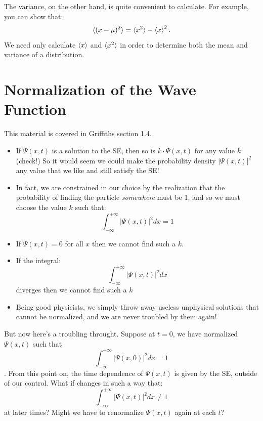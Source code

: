 \documentclass[12pt]{book}
\begin{document}
The variance, on the other hand, is quite convenient to calculate.
For example, you can show that:
\begin{equation}
\label{eqn:varhw}
\braket{(x-\mu)^2} = \braket{x^2} -\braket{x}^2.
\end{equation}
We need only calculate $\braket{x}$ and $\braket{x^2}$ in order
to determine both the mean and variance of a distribution.

\section{Normalization of the Wave Function}

This material is covered in Griffiths section 1.4.  
\begin{itemize}
 \item If $\Psi(x,t)$ is a solution to the SE, then so is $k \cdot \Psi(x,t)$ for any value $k$ (check!)  So it would seem we could make the probability density $|\Psi(x,t)|^2$ any value that we like and still satisfy the SE!  
 \item In fact, we are constrained in our choice by the realization that the probability of finding the particle {\em somewhere} must be 1, and so we must choose the value $k$ such that:
\begin{equation}
\label{eqn:norm}
\int_{-\infty}^{+\infty} |\Psi(x,t)|^2 dx = 1
\end{equation}

\item If $\Psi(x,t)=0$ for all $x$ then we cannot find such a $k$.
 \item If the integral:
$$\int_{-\infty}^{+\infty} |\Psi(x,t)|^2 dx$$
diverges then we cannot find such a $k$
\item Being good physicists, we simply throw away useless unphysical solutions that cannot be normalized, and we are never troubled by them again! 
\end{itemize}

But now here's a troubling throught.  Suppose at $t=0$, we have normalized $\Psi(x,t)$ such that
$$\int_{-\infty}^{+\infty} |\Psi(x,0)|^2 dx = 1$$.  
From this point on, the time dependence of $\Psi(x,t)$ is given by the SE, outside of our control.  What if changes in such a way that:
$$\int_{-\infty}^{+\infty} |\Psi(x,t)|^2 dx \neq 1$$ 
at later times?  Might we have to renormalize $\Psi(x,t)$ again at each $t$?
\end{document}
